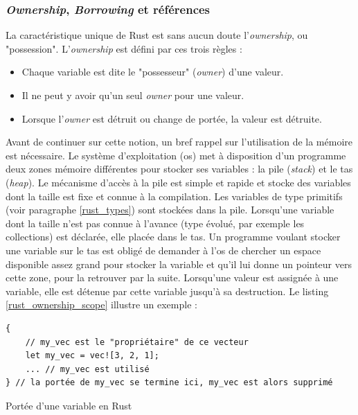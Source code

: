 \subsubsection{\textit{Ownership}, \textit{Borrowing} et références}\label{rust_ownership_borrowing}
La caractéristique unique de Rust est sans aucun doute l'\textit{ownership}, ou "possession". 
L'\textit{ownership} est défini par ces trois règles :
\begin{itemize}
    \item Chaque variable est dite le "possesseur" (\textit{owner}) d'une valeur.
    \item Il ne peut y avoir qu'un seul \textit{owner} pour une valeur.
    \item Lorsque l'\textit{owner} est détruit ou change de portée, la valeur est détruite.
\end{itemize}
Avant de continuer sur cette notion, un bref rappel sur l'utilisation de la mémoire est nécessaire. 
Le système d'exploitation (\acrshort{os}) met à disposition d'un programme deux zones mémoire différentes pour stocker ses 
variables : la pile (\textit{stack}) et le tas (\textit{heap}). Le mécanisme d'accès à la pile est 
simple et rapide et stocke des variables dont la taille est fixe et connue à la compilation. Les 
variables de type primitifs (voir paragraphe \ref{rust_types}) sont stockées dans la pile. Lorsqu'une 
variable dont la taille n'est pas connue à l'avance (type évolué, par exemple les collections) est 
déclarée, elle placée dans le tas. Un programme voulant stocker une variable sur le tas est obligé 
de demander à l'\acrshort{os} de chercher un espace disponible assez grand pour stocker la variable 
et qu'il lui donne un pointeur vers cette zone, pour la retrouver par la suite.
\bigbreak
Lorsqu'une valeur est assignée à une variable, elle est détenue par cette variable jusqu'à sa 
destruction. Le listing \ref{rust_ownership_scope} illustre un exemple :
\bigbreak
\begin{code}
    \begin{verbatim}
{
    // my_vec est le "propriétaire" de ce vecteur
    let my_vec = vec![3, 2, 1]; 
    ... // my_vec est utilisé
} // la portée de my_vec se termine ici, my_vec est alors supprimé
    \end{verbatim}
    \caption{Portée d'une variable en Rust}
    \label{rust_ownership_scope}
\end{code}
